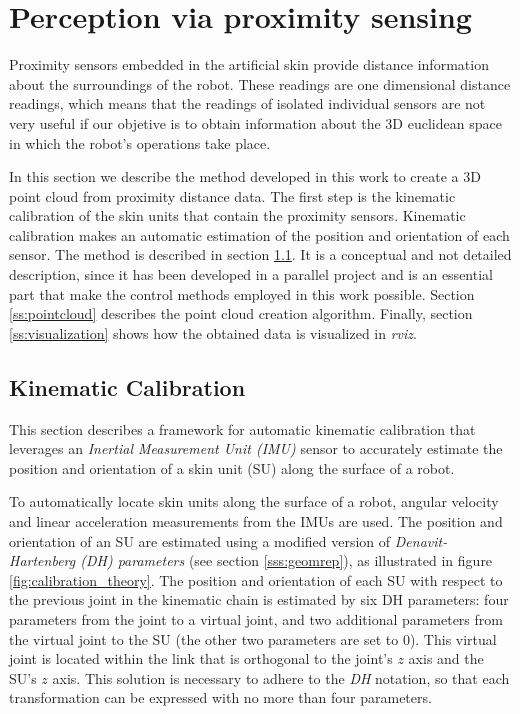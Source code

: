\section{Perception via proximity sensing}

Proximity sensors embedded in the artificial skin provide distance information about the surroundings of the robot. These readings are one dimensional distance readings, which means that the readings of isolated individual sensors are not very useful if our objetive is to obtain information about the 3D euclidean space in which the robot's operations take place.

In this section we describe the method developed in this work to create a 3D point cloud from proximity distance data. The first step is the kinematic calibration of the skin units that contain the proximity sensors. Kinematic calibration makes an automatic estimation of the position and orientation of each sensor. The method is described in section \ref{ss:calibration}. It is a conceptual and not detailed description, since it has been developed in a parallel project and is an essential part that make the control methods employed in this work possible. Section \ref{ss:pointcloud} describes the point cloud creation algorithm. Finally, section \ref{ss:visualization} shows how the obtained data is visualized in \textit{rviz}.

\subsection{Kinematic Calibration}
\label{ss:calibration}

This section describes a framework for automatic kinematic calibration that leverages an
\textit{Inertial Measurement Unit (IMU)} sensor to accurately estimate the position and orientation of a skin unit (SU) along the surface of a robot.

To automatically locate skin units along the surface of a robot, angular velocity and linear acceleration measurements from the IMUs are used. The position and orientation of an SU are estimated
using a modified version of \textit{Denavit-Hartenberg (DH) parameters} (see section \ref{sss:geomrep}), as illustrated in figure \ref{fig:calibration_theory}.
The position and orientation of each SU with respect to the previous
joint in the kinematic chain is estimated by six DH parameters: four parameters from the joint to a virtual joint,
and two additional parameters from the virtual joint to the SU (the other two parameters are set to $0$). This virtual joint is located within the link that is orthogonal to the joint’s $z$ axis and the SU’s $z$ axis.
This solution is necessary to adhere to the \textit{DH} notation,
so that each transformation can be expressed with no more than four parameters.

